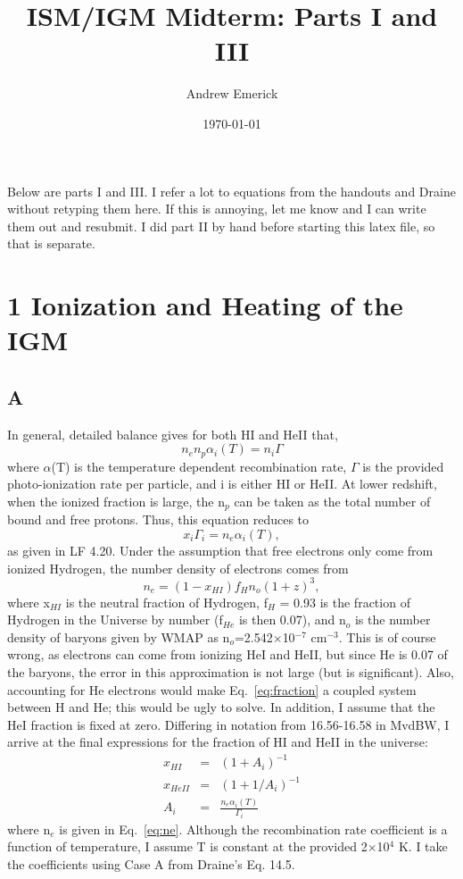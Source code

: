 \documentclass[a4paper]{article}
\date{\today}
\title{ISM/IGM Midterm: Parts I and III}
\author{Andrew Emerick}
\begin{document}
\maketitle
Below are parts I and III. I refer a lot to equations from the handouts and 
Draine without retyping them here. If this is annoying, let me know and I can 
write them out and resubmit. I did part II by hand before starting this latex
file, so that is separate.

\section{1 Ionization and Heating of the IGM}
\subsection{A}
In general, detailed balance gives for both HI and HeII that,
\begin{equation} n_e n_p \alpha_i (T) = n_i \Gamma \end{equation}
where $\alpha$(T) is the temperature dependent recombination rate, $\Gamma$ is
the provided photo-ionization rate per particle, and i is either HI or HeII.
At lower redshift, when the ionized fraction is large, the n$_p$ can be taken
as the total number of bound and free protons. Thus, this equation reduces
to
\begin{equation} x_{i} \Gamma_{i} = n_{e} \alpha_{i}(T), \end{equation}
as given in LF 4.20. Under the assumption that free electrons only come from
ionized Hydrogen, the number density of electrons comes from
\begin{equation} n_e = (1 - x_{HI}) f_H n_o (1+z)^3, \label{eq:ne} \end{equation}
where x$_{HI}$ is the neutral fraction of Hydrogen,
f$_H$ = 0.93 is the fraction of Hydrogen in the Universe by number 
(f$_{He}$ is then 0.07), and n$_o$ is the number density of baryons given
by WMAP as n$_o$=2.542$\times$10$^{-7}$ cm$^{-3}$. This is of course wrong,
as electrons can come from ionizing HeI and HeII, but since He is 0.07 of the 
baryons, the error in this approximation is not large (but is significant). 
Also, accounting for He electrons would make Eq.~\eqref{eq:fraction} a coupled
system between H and He; this would be ugly to solve.
In addition, I assume that the HeI fraction is fixed at zero. 
Differing in notation from 16.56-16.58 in MvdBW, I arrive at the final
expressions for the fraction of HI and HeII in the universe:
\begin{eqnarray}
\label{eq:fraction}
x_{HI} &= &(1 + A_{i})^{-1} \\
x_{HeII}& = &(1 + 1/A_{i})^{-1}\\
A_{i}& =& \frac{n_e \alpha_{i}(T)}{\Gamma_{i}}
\end{eqnarray}
where n$_e$ is given in Eq.~\ref{eq:ne}. Although the recombination rate 
coefficient is a function of temperature, I assume T is constant at the 
provided 2$\times$10$^{4}$ K. I take the coefficients using Case A from Draine's
Eq. 14.5. 
\end{document}
